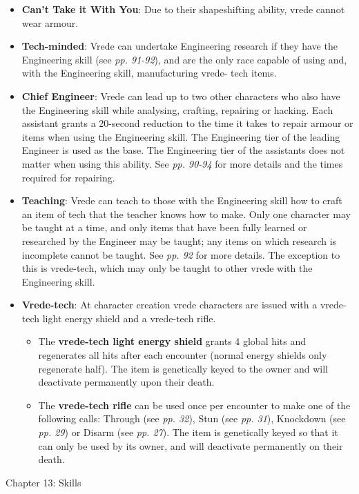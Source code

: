 \documentclass{scrbook}
\begin{document}
\begin{itemize}
\item \textbf{Can't Take it With You}: Due to their shapeshifting ability, vrede cannot wear armour.

\item \textbf{Tech-minded}: Vrede can undertake Engineering research if they have the Engineering skill (see \textit{pp. 91-92}), and are the only race capable of using and, with the Engineering skill, manufacturing vrede- tech items.

\item \textbf{Chief Engineer}: Vrede can lead up to two other characters who also have the Engineering skill while analysing, crafting, repairing or hacking. Each assistant grants a 20-second reduction to the time it takes to repair armour or items when using the Engineering skill. The Engineering tier of the leading Engineer is used as the base. The Engineering tier of the assistants does not matter when using this ability. See \textit{pp. 90-94} for more details and the times required for repairing.

\item \textbf{Teaching}: Vrede can teach to those with the Engineering skill how to craft an item of tech that the teacher knows how to make. Only one character may be taught at a time, and only items that have been fully learned or researched by the Engineer may be taught; any items on which research is incomplete cannot be taught. See \textit{pp. 92} for more details. The exception to this is vrede-tech, which may only be taught to other vrede with the Engineering skill.

\item \textbf{Vrede-tech}: At character creation vrede characters are issued with a vrede-tech light energy shield and a vrede-tech rifle.

\begin{itemize}
\item The \textbf{vrede-tech light energy shield} grants 4 global hits and regenerates all hits after each encounter (normal energy shields only regenerate half). The item is genetically keyed to the owner and will deactivate permanently upon their death.

\item The \textbf{vrede-tech rifle} can be used once per encounter to make one of the following calls: Through (see \textit{pp. 32}), Stun (see \textit{pp. 31}), Knockdown (see \textit{pp. 29}) or Disarm (see \textit{pp. 27}). The item is genetically keyed so that it can only be used by its owner, and will deactivate permanently on their death.

\end{itemize}

\end{itemize}
Chapter 13: Skills
\end{document}
